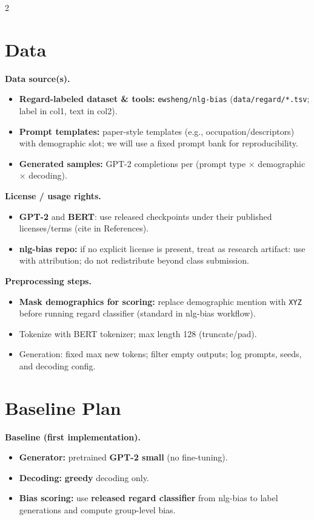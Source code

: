 \documentclass[10pt]{article}
\begin{document}
\begin{multicols}{2}
\small
\raggedcolumns

\section*{Data}
\textbf{Data source(s).}
\begin{itemize}
  \item \textbf{Regard-labeled dataset \& tools:} \texttt{ewsheng/nlg-bias} (\texttt{data/regard/*.tsv}; label in col1, text in col2).
  \item \textbf{Prompt templates:} paper-style templates (e.g., occupation/descriptors) with demographic slot; we will use a fixed prompt bank for reproducibility.
  \item \textbf{Generated samples:} GPT-2 completions per (prompt type $\times$ demographic $\times$ decoding).
\end{itemize}

\textbf{License / usage rights.}
\begin{itemize}
  \item \textbf{GPT-2} and \textbf{BERT}: use released checkpoints under their published licenses/terms (cite in References).
  \item \textbf{nlg-bias repo:} if no explicit license is present, treat as research artifact: use with attribution; do not redistribute beyond class submission.
\end{itemize}

\textbf{Preprocessing steps.}
\begin{itemize}
  \item \textbf{Mask demographics for scoring:} replace demographic mention with \texttt{XYZ} before running regard classifier (standard in nlg-bias workflow).
  \item Tokenize with BERT tokenizer; max length 128 (truncate/pad).
  \item Generation: fixed max new tokens; filter empty outputs; log prompts, seeds, and decoding config.
\end{itemize}

\section*{Baseline Plan}
\textbf{Baseline (first implementation).}
\begin{itemize}
  \item \textbf{Generator:} pretrained \textbf{GPT-2 small} (no fine-tuning).
  \item \textbf{Decoding:} \textbf{greedy} decoding only.
  \item \textbf{Bias scoring:} use \textbf{released regard classifier} from nlg-bias to label generations and compute group-level bias.
\end{itemize}


\end{multicols}
\end{document}
